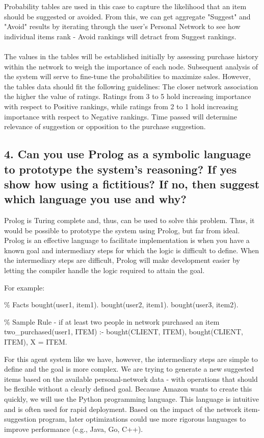 \documentclass[12pt,a4paper]{article}
\begin{document}
		Probability tables are used in this case to capture the likelihood that an item should be suggested or avoided. From this, we can get aggregate "Suggest" and "Avoid" results by iterating through the user's Personal Network to see how individual items rank - Avoid rankings will detract from Suggest rankings.  
		\\\\
		The values in the tables will be established initially by assessing purchase history within the network to weigh the importance of each node. Subsequent analysis of the system will serve to fine-tune the probabilities to maximize sales. However, the tables data should fit the following guidelines: The closer network association the higher the value of ratings. Ratings from 3 to 5 hold increasing importance with respect to Positive rankings, while ratings from 2 to 1 hold increasing importance with respect to Negative rankings.  Time passed will determine relevance of suggestion or opposition to the purchase suggestion.
		
	\subsection*{4. Can you use Prolog as a symbolic language to prototype the system's reasoning? If yes show how using a fictitious? If no, then suggest which language you use and why?}
		Prolog is Turing complete and, thus, can be used to solve this problem. Thus, it would be possible to prototype the system using Prolog, but far from ideal. Prolog is an effective language to facilitate implementation is when you have a known goal and intermediary steps for which the logic is difficult to define. When the intermediary steps are difficult, Prolog will make development easier by letting the compiler handle the logic required to attain the goal. 
		
		For example:
		
		\% Facts
		bought(user1, item1).
		bought(user2, item1).
		bought(user3, item2).
		
		\% Sample Rule - if at least two people in network purchased an item
		two\_purchased(user1, ITEM) :- 
		bought(CLIENT, ITEM), bought(CLIENT, ITEM), X = ITEM.
		
		
		For this agent system like we have, however, the intermediary steps are simple to define and the goal is more complex. We are trying to generate a new suggested items based on the available personal-network data - with operations that should be flexible without a clearly defined goal. Because Amazon wants to create this quickly, we will use the Python programming language. This language is intuitive and is often used for rapid deployment. Based on the impact of the network item-suggestion program, later optimizations could use more rigorous languages to improve performance (e.g., Java, Go, C++).
		
	
		
\end{document}
